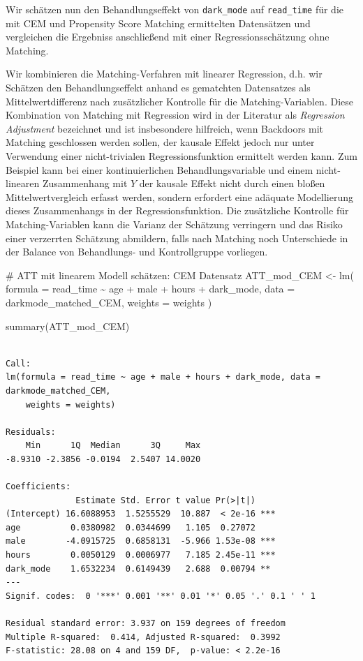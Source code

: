 \documentclass[
  a4paper,
  DIV=11,
  oneside]{scrreprt}
\newenvironment{Shaded}{\begin{snugshade}}{\end{snugshade}}
\newcommand{\AttributeTok}[1]{\textcolor[rgb]{0.40,0.45,0.13}{#1}}
\newcommand{\CommentTok}[1]{\textcolor[rgb]{0.37,0.37,0.37}{#1}}
\newcommand{\FunctionTok}[1]{\textcolor[rgb]{0.28,0.35,0.67}{#1}}
\newcommand{\NormalTok}[1]{\textcolor[rgb]{0.00,0.23,0.31}{#1}}
\newcommand{\OtherTok}[1]{\textcolor[rgb]{0.00,0.23,0.31}{#1}}
\newcommand{\SpecialCharTok}[1]{\textcolor[rgb]{0.37,0.37,0.37}{#1}}
\begin{document}
Wir schätzen nun den Behandlungseffekt von \texttt{dark\_mode} auf
\texttt{read\_time} für die mit CEM und Propensity Score Matching
ermittelten Datensätzen und vergleichen die Ergebniss anschließend mit
einer Regressionsschätzung ohne Matching.

Wir kombinieren die Matching-Verfahren mit linearer Regression, d.h. wir
Schätzen den Behandlungseffekt anhand es gematchten Datensatzes als
Mittelwertdifferenz nach zusätzlicher Kontrolle für die
Matching-Variablen. Diese Kombination von Matching mit Regression wird
in der Literatur als \emph{Regression Adjustment} bezeichnet und ist
insbesondere hilfreich, wenn Backdoors mit Matching geschlossen werden
sollen, der kausale Effekt jedoch nur unter Verwendung einer
nicht-trivialen Regressionsfunktion ermittelt werden kann. Zum Beispiel
kann bei einer kontinuierlichen Behandlungsvariable und einem
nicht-linearen Zusammenhang mit \(Y\) der kausale Effekt nicht durch
einen bloßen Mittelwertvergleich erfasst werden, sondern erfordert eine
adäquate Modellierung dieses Zusammenhangs in der Regressionsfunktion.
Die zusätzliche Kontrolle für Matching-Variablen kann die Varianz der
Schätzung verringern und das Risiko einer verzerrten Schätzung
abmildern, falls nach Matching noch Unterschiede in der Balance von
Behandlungs- und Kontrollgruppe vorliegen.

\begin{Shaded}
\begin{Highlighting}[]
\CommentTok{\# ATT mit linearem Modell schätzen: CEM Datensatz}
\NormalTok{ATT\_mod\_CEM }\OtherTok{\textless{}{-}} \FunctionTok{lm}\NormalTok{(}
  \AttributeTok{formula =}\NormalTok{ read\_time }\SpecialCharTok{\textasciitilde{}}\NormalTok{ age }\SpecialCharTok{+}\NormalTok{ male }\SpecialCharTok{+}\NormalTok{ hours }\SpecialCharTok{+}\NormalTok{ dark\_mode,}
  \AttributeTok{data =}\NormalTok{ darkmode\_matched\_CEM, }
  \AttributeTok{weights =}\NormalTok{ weights }
\NormalTok{)}

\FunctionTok{summary}\NormalTok{(ATT\_mod\_CEM)}
\end{Highlighting}
\end{Shaded}

\begin{verbatim}

Call:
lm(formula = read_time ~ age + male + hours + dark_mode, data = darkmode_matched_CEM, 
    weights = weights)

Residuals:
    Min      1Q  Median      3Q     Max 
-8.9310 -2.3856 -0.0194  2.5407 14.0020 

Coefficients:
              Estimate Std. Error t value Pr(>|t|)    
(Intercept) 16.6088953  1.5255529  10.887  < 2e-16 ***
age          0.0380982  0.0344699   1.105  0.27072    
male        -4.0915725  0.6858131  -5.966 1.53e-08 ***
hours        0.0050129  0.0006977   7.185 2.45e-11 ***
dark_mode    1.6532234  0.6149439   2.688  0.00794 ** 
---
Signif. codes:  0 '***' 0.001 '**' 0.01 '*' 0.05 '.' 0.1 ' ' 1

Residual standard error: 3.937 on 159 degrees of freedom
Multiple R-squared:  0.414, Adjusted R-squared:  0.3992 
F-statistic: 28.08 on 4 and 159 DF,  p-value: < 2.2e-16
\end{verbatim}
\end{document}
